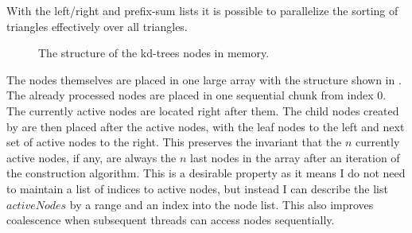 With the left/right and prefix-sum lists it is possible to parallelize
the sorting of triangles effectively over all triangles.


\begin{figure}
  \centering
  \caption{The structure of the kd-trees nodes in memory.}
  \label{fig:nodeStructure}
\end{figure}

The nodes themselves are placed in one large array with the structure
shown in . The already processed nodes are
placed in one sequential chunk from index 0. The currently active
nodes are located right after them. The child nodes created by
 are then placed after the active
nodes, with the leaf nodes to the left and next set of active nodes to
the right. This preserves the invariant that the $n$ currently active
nodes, if any, are always the $n$ last nodes in the array after an
iteration of the construction algorithm. This is a desirable property
as it means I do not need to maintain a list of indices to active
nodes, but instead I can describe the list $activeNodes$ by a range
and an index into the node list. This also improves coalescence when
subsequent threads can access nodes sequentially.


